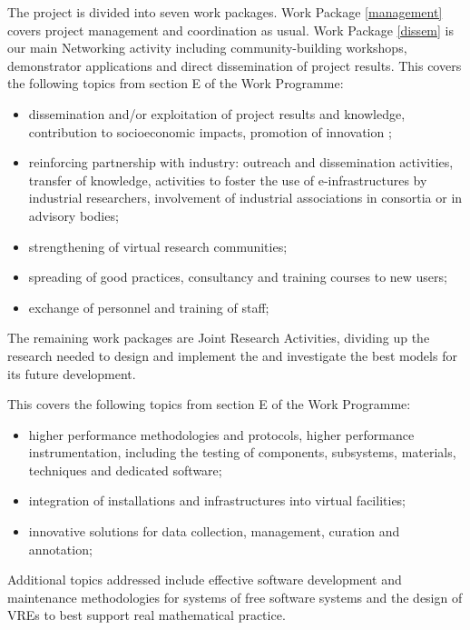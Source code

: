 The project is divided into seven work packages. Work Package
\ref{management} covers project management and coordination as
usual. Work Package \ref{dissem} is our main Networking activity
including community-building workshops, demonstrator applications and
direct dissemination of project results.
This covers the following topics from section E of the Work Programme:
\begin{itemize}
\item  dissemination and/or exploitation of project results and knowledge, contribution to socioeconomic
impacts, promotion of innovation ;
\item reinforcing partnership with industry: outreach and dissemination activities, transfer of
knowledge, activities to foster the use of e-infrastructures by industrial researchers,
involvement of industrial associations in consortia or in advisory bodies;
\item strengthening of virtual research communities;
\item spreading of good practices, consultancy and training courses to new users;
\item exchange of personnel and training of staff;
\end{itemize}


The remaining work packages are Joint Research Activities, dividing up
the research needed to design and implement the \TheProject and
investigate the best models for its future development. 

This covers the following topics from section E of the Work Programme:

\begin{itemize}
\item higher performance methodologies and protocols, higher performance instrumentation,
including the testing of components, subsystems, materials, techniques and dedicated
software;
\item integration of installations and infrastructures into virtual facilities;
\item innovative solutions for data collection, management, curation
  and annotation;
\end{itemize}


Additional topics addressed include effective software development and
maintenance methodologies for systems of free software systems and the
design of VREs to best support real mathematical practice.

